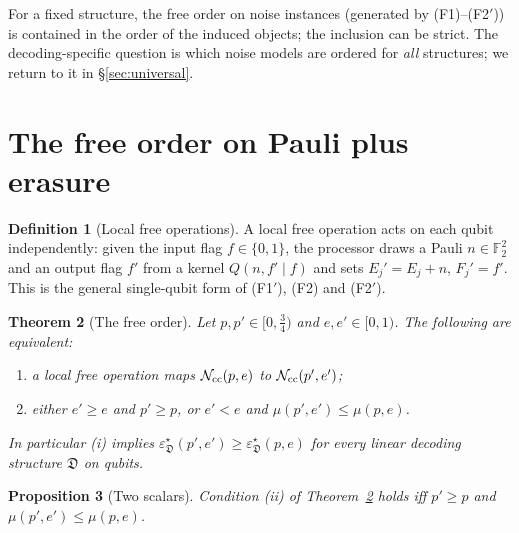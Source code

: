 \documentclass[11pt,a4paper]{article}
\theoremstyle{plain}
\newtheorem{theorem}{Theorem}[section]
\newtheorem{proposition}[theorem]{Proposition}
\theoremstyle{definition}
\newtheorem{definition}[theorem]{Definition}
\theoremstyle{remark}
\newcommand{\F}{\mathbb{F}_2}
\newcommand{\err}{\varepsilon^{\star}}
\newcommand{\Ncc}{\mathcal{N}_{\rm cc}}
\begin{document}
For a fixed structure, the free order on noise instances (generated by (F1)--(F2$'$)) is contained in the order of the induced objects; the inclusion can be strict. The decoding-specific question is which noise models are ordered for \emph{all} structures; we return to it in \S\ref{sec:universal}.

\section{The free order on Pauli plus erasure}\label{sec:order}

\begin{definition}[Local free operations]\label{def:local}
A local free operation acts on each qubit independently: given the input flag $f\in\{0,1\}$, the processor draws a Pauli $n\in\F^2$ and an output flag $f'$ from a kernel $Q(n,f'\mid f)$ and sets $E_j'=E_j+n$, $F_j'=f'$. This is the general single-qubit form of (F1$'$), (F2) and (F2$'$).
\end{definition}

\begin{theorem}[The free order]\label{thm:preorder}
Let $p,p'\in[0,\tfrac34)$ and $e,e'\in[0,1)$. The following are equivalent:
\begin{enumerate}[label=(\roman*)]
\item a local free operation maps $\Ncc(p,e)$ to $\Ncc(p',e')$;
\item either $e'\ge e$ and $p'\ge p$, or $e'<e$ and $\mu(p',e')\le\mu(p,e)$.
\end{enumerate}
In particular (i) implies $\err_{\mathfrak D}(p',e')\ge\err_{\mathfrak D}(p,e)$ for every linear decoding structure $\mathfrak D$ on qubits.
\end{theorem}

\begin{proposition}[Two scalars]\label{prop:two-scalars}
Condition (ii) of Theorem~\ref{thm:preorder} holds iff $p'\ge p$ and $\mu(p',e')\le\mu(p,e)$.
\end{proposition}
\end{document}
